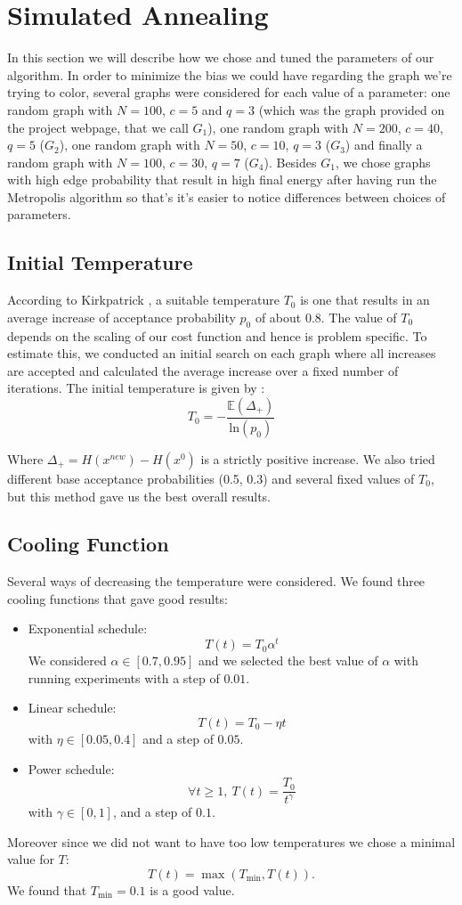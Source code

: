 \documentclass[a4paper]{article}
\begin{document}
\section{Simulated Annealing}
In this section we will describe how we chose and tuned the parameters of our algorithm. In order to minimize the bias we could have regarding the graph we're trying to color, several graphs were considered for each value of a parameter: one random graph with $N=100$, $c=5$ and $q=3$ (which was the graph provided on the project webpage, that we call $G_1$), one random graph with $N=200$, $c=40$, $q=5$ ($G_2$), one random graph with $N=50$, $c=10$, $q=3$ ($G_3$) and finally a random graph with $N=100$, $c=30$, $q=7$ ($G_4$). Besides $G_1$, we chose graphs with high edge probability that result in high final energy after having run the Metropolis algorithm so that's it's easier to notice differences between choices of parameters.

\subsection{Initial Temperature}
According to Kirkpatrick \cite{kirkpatrick}, a suitable temperature $T_0$ is one that results in an average increase of acceptance probability $p_0$ of about 0.8. The value of $T_0$ depends on the scaling of our cost function and hence is problem specific. To estimate this, we conducted an initial search on each graph where all increases are accepted and calculated the average increase over a fixed number of iterations. The initial temperature is given by :
$$T_0=-\dfrac{\mathbb{E}(\Delta_+)}{\mathrm{ln}(p_0)}$$

Where $\Delta_+ = H(x^{new}) - H(x^0)$ is a strictly positive increase. We also tried different base acceptance probabilities (0.5, 0.3) and several fixed values of $T_0$, but this method gave us the best overall results.

\subsection{Cooling Function}
Several ways of decreasing the temperature were considered. We found three cooling functions that gave good results:
\begin{itemize}
\item Exponential schedule: $$T(t)=T_0 \alpha^t$$
We considered $\alpha \in [0.7,0.95]$ and we selected the best value of $\alpha$ with running experiments with a step of $0.01$.
\item Linear schedule: $$T(t)=T_0 -\eta t$$ with $\eta \in [0.05,0.4]$ and a step of $0.05$.
\item Power schedule: $$\forall t \geqslant 1, \ T(t)=\dfrac{T_0}{t^{\gamma}}$$ with $\gamma \in [0,1]$, and a step of $0.1$.
\end{itemize}
Moreover since we did not want to have too low temperatures we chose a minimal value for $T$: $$T(t)=\max(T_{\min},T(t)).$$ We found that $T_{\min}=0.1$ is a good value. 
\\
\end{document}
